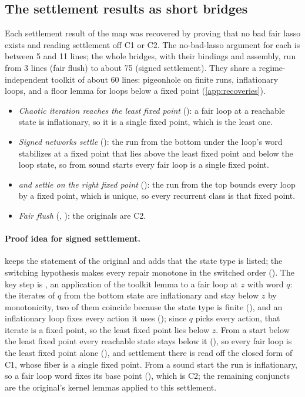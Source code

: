 \subsection{The settlement results as short bridges}

Each settlement result of the map was recovered by proving that no bad fair lasso exists and reading
settlement off C1 or C2. The no-bad-lasso argument for each is between 5 and 11 lines; the whole bridges,
with their bindings and assembly, run from 3 lines (fair flush) to about 75 (signed settlement). They
share a regime-independent toolkit of about 60 lines: pigeonhole on finite runs, inflationary loops, and a floor lemma for
loops below a fixed point (\cref{app:recoveries}).

\begin{itemize}[nosep]
  \item \emph{Chaotic iteration reaches the least fixed point} (): a fair
    loop at a reachable state is inflationary, so it is a single fixed point, which is the least one.
  \item \emph{Signed networks settle} (): the run from the bottom under the
    loop's word stabilizes at a fixed point that lies above the least fixed point and below the loop
    state, so from sound starts every fair loop is a
    single fixed point.
  \item \emph{and settle on the right fixed point} (): the run from the top
    bounds every loop by a fixed point, which is unique, so every recurrent class is that fixed point.
  \item \emph{Fair flush} (, ): the originals are C2.
\end{itemize}

\paragraph{Proof idea for signed settlement.}
 keeps the statement of the original and adds that the state type is
listed; the switching hypothesis makes every repair monotone in the switched order
(). The key step is , an application of the toolkit lemma
 to a fair loop at $z$ with word $q$: the iterates of $q$ from the bottom state are
inflationary and stay below $z$ by monotonicity, two of them coincide because the state type is
finite (), and an inflationary loop fixes every action it uses ();
since $q$ picks every action, that iterate is a fixed point, so the least fixed point lies below $z$.
From a start below the least fixed point every reachable state stays below it (), so
every fair loop is the least fixed point alone (), and settlement there is read
off the closed form of C1, whose fiber is a single fixed point. From a sound start the run is
inflationary, so a fair loop word fixes its base point (), which is C2; the
remaining conjuncts are the original's kernel lemmas applied to this settlement.

